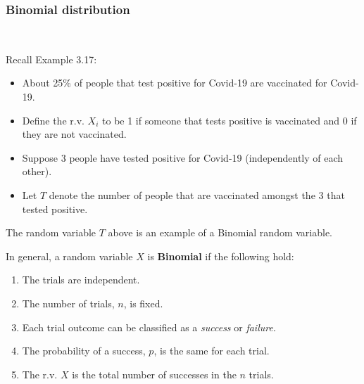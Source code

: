 \documentclass[12pt]{amsart}
\begin{document}
{%

\newpage
\subsubsection{Binomial distribution}  $ \ $



\vspace{0.5cm}
Recall Example 3.17:
\begin{itemize}
\item About 25\% of people that test positive for Covid-19 are vaccinated for Covid-19.
\item Define the r.v. $X_i$ to be 1 if someone that tests positive is vaccinated and 0 if they are not vaccinated. 
\item Suppose 3 people have tested positive for Covid-19 (independently of each other). 
\item Let $T$ denote the number of people that are vaccinated amongst the 3 that tested positive.
\end{itemize}

\vspace{0.5cm}
The random variable $T$ above is an example of a Binomial random variable. \newline

\vspace{0.5cm}

In general, a random variable $X$ is \textbf{Binomial} if the following hold:

\vspace{0.5cm}
\begin{enumerate}
\item The trials are independent.
\item The number of trials, $n$, is fixed. 
\item Each trial outcome can be classified as a \emph{success} or \emph{failure}.
\item The probability of a success, $p$, is the same for each trial.
\item The r.v. $X$ is the total number of successes in the $n$ trials.
\end{enumerate}



}
\end{document}
